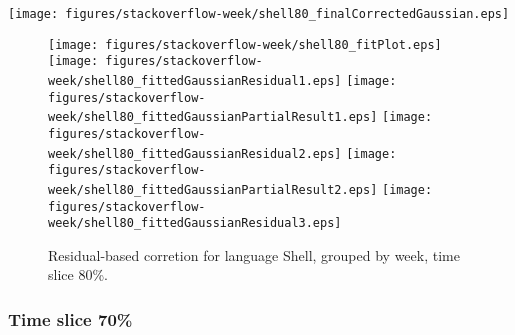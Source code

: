 \begin{center}
{\texttt{[image: figures/stackoverflow-week/shell80\_finalCorrectedGaussian.eps]}}
\end{center}

\FloatBarrier

\begin{figure}[t]
\centering
{}
{\texttt{[image: figures/stackoverflow-week/shell80\_fitPlot.eps]}}
{\texttt{[image: figures/stackoverflow-week/shell80\_fittedGaussianResidual1.eps]}}
{\texttt{[image: figures/stackoverflow-week/shell80\_fittedGaussianPartialResult1.eps]}}
{\texttt{[image: figures/stackoverflow-week/shell80\_fittedGaussianResidual2.eps]}}
{\texttt{[image: figures/stackoverflow-week/shell80\_fittedGaussianPartialResult2.eps]}}
{\texttt{[image: figures/stackoverflow-week/shell80\_fittedGaussianResidual3.eps]}}
\caption{Residual-based corretion for language Shell, grouped by week, time slice 80\%.}
\end{figure}


\FloatBarrier


\subsubsection{Time slice 70\%}

